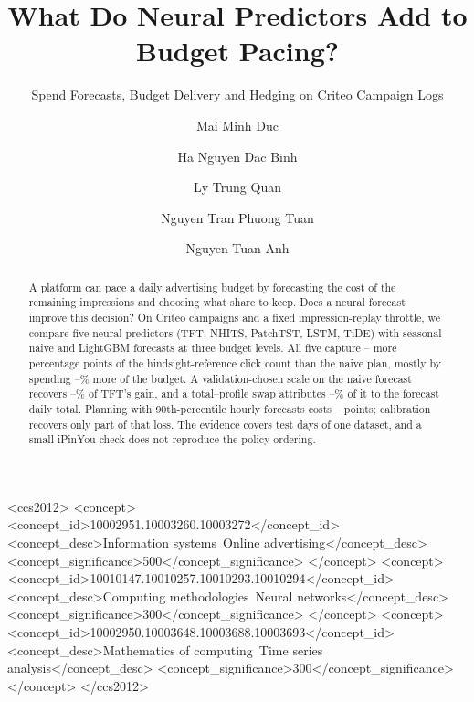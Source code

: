 \documentclass[sigconf,nonacm]{acmart}
\begin{document}
\title{What Do Neural Predictors Add to Budget Pacing?}
\subtitle{Spend Forecasts, Budget Delivery and Hedging on Criteo Campaign Logs}

\author{Mai Minh Duc}

\author{Ha Nguyen Dac Binh}

\author{Ly Trung Quan}

\author{Nguyen Tran Phuong Tuan}

\author{Nguyen Tuan Anh}

\begin{abstract}
A platform can pace a daily advertising budget by forecasting the cost of the
remaining impressions and choosing what share to keep. Does a neural forecast
improve this decision? On  Criteo campaigns and a fixed
impression-replay throttle, we compare five neural predictors (TFT, NHITS,
PatchTST, LSTM, TiDE) with seasonal-naive and LightGBM forecasts at three
budget levels. All five capture -- more
percentage points of the hindsight-reference click count than the naive plan,
mostly by spending --\% more of the budget.
A validation-chosen scale on the naive forecast recovers
--\% of TFT's gain, and a
total--profile swap attributes --\% of
it to the forecast daily total. Planning with 90th-percentile hourly forecasts
costs -- points; calibration recovers
only part of that loss. The evidence covers  test days of
one dataset, and a small iPinYou check does not reproduce the policy ordering.
\end{abstract}

\begin{CCSXML}
<ccs2012>
   <concept>
       <concept_id>10002951.10003260.10003272</concept_id>
       <concept_desc>Information systems~Online advertising</concept_desc>
       <concept_significance>500</concept_significance>
   </concept>
   <concept>
       <concept_id>10010147.10010257.10010293.10010294</concept_id>
       <concept_desc>Computing methodologies~Neural networks</concept_desc>
       <concept_significance>300</concept_significance>
   </concept>
   <concept>
       <concept_id>10002950.10003648.10003688.10003693</concept_id>
       <concept_desc>Mathematics of computing~Time series analysis</concept_desc>
       <concept_significance>300</concept_significance>
   </concept>
</ccs2012>
\end{CCSXML}
\end{document}
